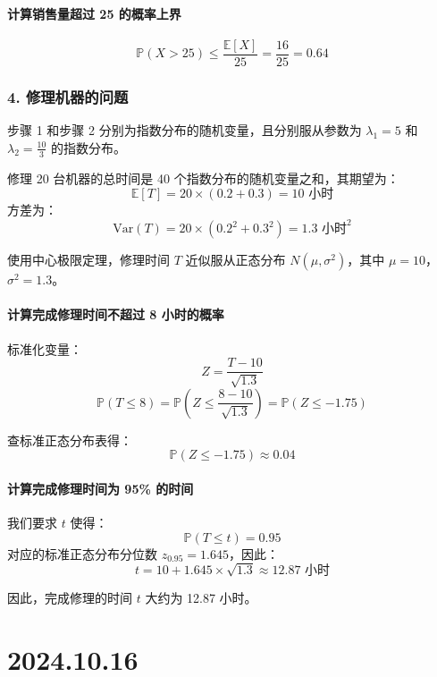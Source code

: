 \documentclass[UTF8]{report}
\theoremstyle{MyLineTheoremStyle} %
\theoremstyle{MyBlockTheoremStyle} %
\theoremstyle{MySubsubsectionStyle} %
\begin{document}
\subsubsection*{计算销售量超过 25 的概率上界}

\[
\mathbb{P}(X > 25) \leq \frac{\mathbb{E}[X]}{25} = \frac{16}{25} = 0.64
\]

\subsection*{4. 修理机器的问题}

步骤 1 和步骤 2 分别为指数分布的随机变量，且分别服从参数为 \( \lambda_1 = 5 \) 和 \( \lambda_2 = \frac{10}{3} \) 的指数分布。

修理 20 台机器的总时间是 40 个指数分布的随机变量之和，其期望为：
\[
\mathbb{E}[T] = 20 \times \left( 0.2 + 0.3 \right) = 10 \text{ 小时}
\]
方差为：
\[
\text{Var}(T) = 20 \times \left( 0.2^2 + 0.3^2 \right) = 1.3 \text{ 小时}^2
\]

使用中心极限定理，修理时间 \( T \) 近似服从正态分布 \( N(\mu, \sigma^2) \)，其中 \( \mu = 10 \)，\( \sigma^2 = 1.3 \)。

\subsubsection*{计算完成修理时间不超过 8 小时的概率}

标准化变量：
\[
Z = \frac{T - 10}{\sqrt{1.3}}
\]
\[
\mathbb{P}(T \leq 8) = \mathbb{P}\left(Z \leq \frac{8 - 10}{\sqrt{1.3}}\right) = \mathbb{P}(Z \leq -1.75)
\]

查标准正态分布表得：
\[
\mathbb{P}(Z \leq -1.75) \approx 0.04
\]

\subsubsection*{计算完成修理时间为 95\% 的时间}

我们要求 \( t \) 使得：
\[
\mathbb{P}(T \leq t) = 0.95
\]
对应的标准正态分布分位数 \( z_{0.95} = 1.645 \)，因此：
\[
t = 10 + 1.645 \times \sqrt{1.3} \approx 12.87 \text{ 小时}
\]

因此，完成修理的时间 \( t \) 大约为 12.87 小时。



\chapter{2024.10.16}\thispagestyle{fancy}
\end{document}
